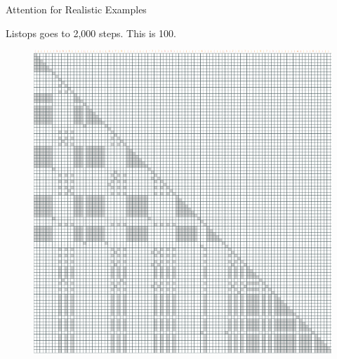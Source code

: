 \begin{frame}[c]{Attention for Realistic Examples}
    \centering
     \begin{center}
    Listops goes to 2,000 steps. This is 100.
    \end{center}

    \begin{figure}
        \centering
        \includegraphics[height=0.6\textheight, clip,trim={0.1cm 0.1cm 0.1cm 0.1cm}]{Figs/big.png}
       \label{fig:my_label}
    \end{figure}
\end{frame}




    